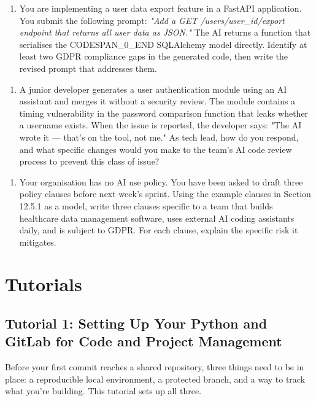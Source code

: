 \documentclass[11pt,a4paper]{book}
\begin{document}
\begin{enumerate}
  \item You are implementing a user data export feature in a FastAPI application. You submit the following prompt: \textit{"Add a GET /users/{user\_id}/export endpoint that returns all user data as JSON."} The AI returns a function that serialises the CODESPAN\_0\_END SQLAlchemy model directly. Identify at least two GDPR compliance gaps in the generated code, then write the revised prompt that addresses them.
\end{enumerate}

\begin{enumerate}
  \item A junior developer generates a user authentication module using an AI assistant and merges it without a security review. The module contains a timing vulnerability in the password comparison function that leaks whether a username exists. When the issue is reported, the developer says: "The AI wrote it --- that's on the tool, not me." As tech lead, how do you respond, and what specific changes would you make to the team's AI code review process to prevent this class of issue?
\end{enumerate}

\begin{enumerate}
  \item Your organisation has no AI use policy. You have been asked to draft three policy clauses before next week's sprint. Using the example clauses in Section 12.5.1 as a model, write three clauses specific to a team that builds healthcare data management software, uses external AI coding assistants daily, and is subject to GDPR. For each clause, explain the specific risk it mitigates.
\end{enumerate}


\part{Tutorials}


\chapter{Tutorial 1: Setting Up Your Python and GitLab for Code and Project Management}

Before your first commit reaches a shared repository, three things need to be in place: a reproducible local environment, a protected branch, and a way to track what you're building. This tutorial sets up all three.
\end{document}
